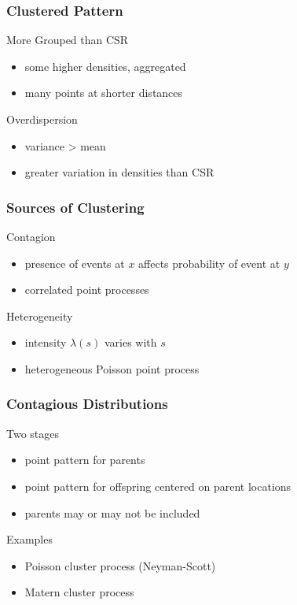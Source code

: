 \documentclass[nototal,handout]{beamer}
\begin{document}
\begin{frame}[<+->]
  \frametitle{Clustered Pattern}
  \begin{block}{More Grouped than CSR}
    \begin{itemize}
      \item some higher densities, aggregated
	\item many points at shorter distances
    \end{itemize}
   \end{block}
   \begin{block}{Overdispersion}
     \begin{itemize}
      \item variance > mean
      \item greater variation in densities than CSR
     \end{itemize}
   \end{block}
 \end{frame}
\begin{frame}[<+->]
  \frametitle{Sources of Clustering}
  \begin{block}{Contagion}
    \begin{itemize}
      \item presence of events at $x$ affects probability of event at $y$
      \item correlated point processes
    \end{itemize}
   \end{block}
   \begin{block}{Heterogeneity}
     \begin{itemize}
      \item intensity $\lambda(s)$ varies with $s$
       \item heterogeneous Poisson point process
     \end{itemize}
   \end{block}

 \end{frame}

 \begin{frame}[<+->]
   \frametitle{Contagious Distributions}
   \begin{block}{Two stages}
     \begin{itemize}
       \item point pattern for parents
       \item point pattern for offspring centered on parent locations
       \item parents may or may not be included
     \end{itemize}
    \end{block}

    \begin{block}{Examples}
      \begin{itemize}
	\item Poisson cluster process (Neyman-Scott)
	\item Matern cluster process
      \end{itemize}
    \end{block}
  \end{frame}
\end{document}
